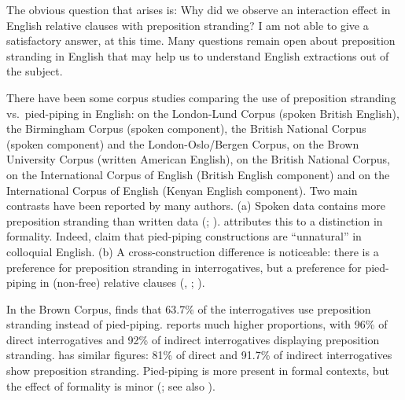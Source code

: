The obvious question that arises is: Why did we observe an interaction effect in English relative clauses with preposition stranding? I am not able to give a satisfactory answer, at this time. Many questions remain open about preposition stranding in English that may help us to understand English extractions out of the subject. 

There have been some corpus studies comparing the use of preposition stranding vs.\ pied-piping in English: \citet{Johansson.1998} on the London-Lund Corpus (spoken British English), the Birmingham Corpus (spoken component), the British National Corpus (spoken component) and the London-Oslo/Bergen Corpus, \citet{Trotta.2000} on the Brown University Corpus (written American English), \citet{Gries.2002} on the British National Corpus, \citet{Hoffmann.2005,Hoffmann.2008,Hoffmann.2011} on the International Corpus of English (British English component) and \citet{Hoffmann.2011} on the International Corpus of English (Kenyan English component). Two main contrasts have been reported by many authors. (a) Spoken data contains more preposition stranding than written data (\citealt[70]{Johansson.1998}; \citealt{Gries.2002}). \citet[280--284]{Hoffmann.2005} attributes this to a distinction in formality. Indeed, \citet[88]{Haegeman.2014} claim that pied-piping constructions are ``unnatural'' in colloquial English. 
(b) A cross-construction difference is noticeable: there is a preference for preposition stranding in interrogatives, but a preference for pied-piping in (non-free) relative clauses (\citet{Johansson.1998}, \citealt{Trotta.2000}; \citealt{Hoffmann.2005,Hoffmann.2011}).

In the Brown Corpus, \citet[57]{Trotta.2000} finds that 63.7\% of the interrogatives use preposition stranding instead of pied-piping. \citet{Hoffmann.2008} reports much higher proportions, with 96\% of direct interrogatives and 92\% of indirect interrogatives displaying preposition stranding. \citet[148 Kenyan English]{Hoffmann.2011} has similar figures: 81\% of direct and 91.7\% of indirect interrogatives show preposition stranding. Pied-piping is more present in formal contexts, but the effect of formality is minor (\citealt[152--155]{Hoffmann.2011}; see also \citealt[64--65]{Trotta.2000}).

